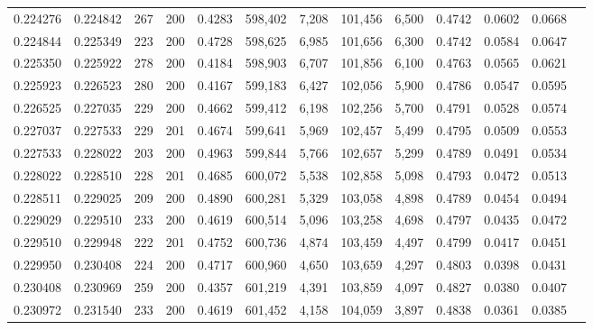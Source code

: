 \begin{tabular}{rrrrrrrrrrrrr}
0.224276 & 0.224842 &   267 & 200 &                                     0.4283 & 598,402 &   7,208 & 101,456 &   6,500 & 0.4742 & 0.0602 & 0.0668 \\
0.224844 & 0.225349 &   223 & 200 &                                     0.4728 & 598,625 &   6,985 & 101,656 &   6,300 & 0.4742 & 0.0584 & 0.0647 \\
0.225350 & 0.225922 &   278 & 200 &                                     0.4184 & 598,903 &   6,707 & 101,856 &   6,100 & 0.4763 & 0.0565 & 0.0621 \\
0.225923 & 0.226523 &   280 & 200 &                                     0.4167 & 599,183 &   6,427 & 102,056 &   5,900 & 0.4786 & 0.0547 & 0.0595 \\
0.226525 & 0.227035 &   229 & 200 &                                     0.4662 & 599,412 &   6,198 & 102,256 &   5,700 & 0.4791 & 0.0528 & 0.0574 \\
0.227037 & 0.227533 &   229 & 201 &                                     0.4674 & 599,641 &   5,969 & 102,457 &   5,499 & 0.4795 & 0.0509 & 0.0553 \\
0.227533 & 0.228022 &   203 & 200 &                                     0.4963 & 599,844 &   5,766 & 102,657 &   5,299 & 0.4789 & 0.0491 & 0.0534 \\
0.228022 & 0.228510 &   228 & 201 &                                     0.4685 & 600,072 &   5,538 & 102,858 &   5,098 & 0.4793 & 0.0472 & 0.0513 \\
0.228511 & 0.229025 &   209 & 200 &                                     0.4890 & 600,281 &   5,329 & 103,058 &   4,898 & 0.4789 & 0.0454 & 0.0494 \\
0.229029 & 0.229510 &   233 & 200 &                                     0.4619 & 600,514 &   5,096 & 103,258 &   4,698 & 0.4797 & 0.0435 & 0.0472 \\
0.229510 & 0.229948 &   222 & 201 &                                     0.4752 & 600,736 &   4,874 & 103,459 &   4,497 & 0.4799 & 0.0417 & 0.0451 \\
0.229950 & 0.230408 &   224 & 200 &                                     0.4717 & 600,960 &   4,650 & 103,659 &   4,297 & 0.4803 & 0.0398 & 0.0431 \\
0.230408 & 0.230969 &   259 & 200 &                                     0.4357 & 601,219 &   4,391 & 103,859 &   4,097 & 0.4827 & 0.0380 & 0.0407 \\
0.230972 & 0.231540 &   233 & 200 &                                     0.4619 & 601,452 &   4,158 & 104,059 &   3,897 & 0.4838 & 0.0361 & 0.0385 \\

\end{tabular}
